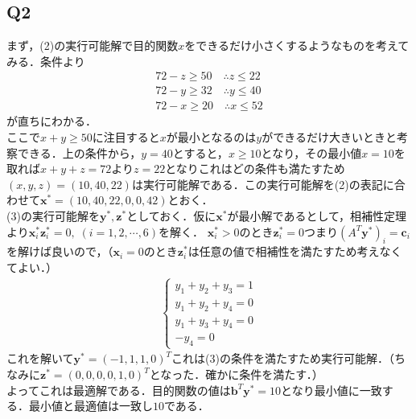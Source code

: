 \documentclass[a4j,uplatex]{jsarticle}
\theoremstyle{definition}
\begin{document}
\subsection{Q2}
まず，(2)の実行可能解で目的関数$x$をできるだけ小さくするようなものを考えてみる．条件より
\begin{align*}
    72-z\geq50\quad \therefore z\leq22 \\
    72-y\geq32\quad \therefore y\leq40 \\
    72-x\geq20\quad \therefore x\leq52
\end{align*}
が直ちにわかる．\\
ここで$x+y\geq50$に注目すると$x$が最小となるのは$y$ができるだけ大きいときと考察できる．上の条件から，$y=40$とすると，$x\geq10$となり，その最小値$x=10$を取れば$x+y+z=72$より$z=22$となりこれはどの条件も満たすため$(x,y,z)=(10,40,22)$は実行可能解である．この実行可能解を(2)の表記に合わせて$\boldsymbol{x}^*=(10,40,22,0,0,42)$とおく．\\
(3)の実行可能解を$\boldsymbol{y}^*,\boldsymbol{z}^*$としておく．仮に$\boldsymbol{x}^*$が最小解であるとして，相補性定理より$\boldsymbol{x}^*_i\boldsymbol{z}^*_i=0,\; (i=1,2,\cdots,6)$を解く．
$\boldsymbol{x}^*_i> 0$のとき$\boldsymbol{z}^*_i=0$つまり$(A^T\boldsymbol{y}^*)_i=\boldsymbol{c}_i$を解けば良いので，（$\boldsymbol{x}_i=0$のとき$\boldsymbol{z}^*_i$は任意の値で相補性を満たすため考えなくてよい．）
\begin{align}
    \begin{cases}
        y_1+y_2+y_3=1 \\
        y_1+y_2+y_4=0 \\
        y_1+y_3+y_4=0 \\
        -y_4=0
    \end{cases}
\end{align}
これを解いて$\boldsymbol{y}^*=(-1,1,1,0)^T$これは(3)の条件を満たすため実行可能解．（ちなみに$\boldsymbol{z}^*=(0,0,0,0,1,0)^T$となった．確かに条件を満たす．）\\
よってこれは最適解である．目的関数の値は$\boldsymbol{b}^T\boldsymbol{y}^*=10$となり最小値に一致する．最小値と最適値は一致し$10$である．
\end{document}

